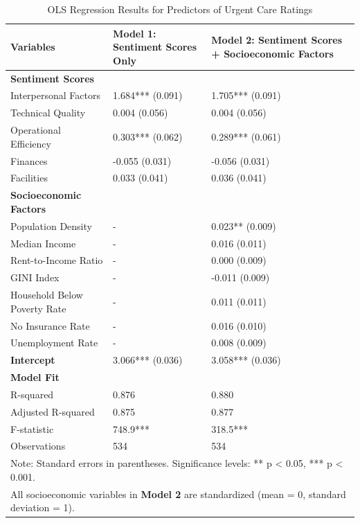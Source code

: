 \documentclass[journal,twoside,web]{ieeecolor}
\begin{document}
\begin{table}[htbp]
\centering
\caption{OLS Regression Results for Predictors of Urgent Care Ratings}
\label{tab:regression}
\begin{tabular}{p{5.5cm}p{5.5cm}p{5.5cm}}
\hline
\textbf{Variables} & \textbf{Model 1: Sentiment Scores Only} & \textbf{Model 2: Sentiment Scores + Socioeconomic Factors} \\
\hline
\textbf{Sentiment Scores} & & \\
Interpersonal Factors & 1.684*** (0.091) & 1.705*** (0.091) \\
Technical Quality & 0.004 (0.056) & 0.004 (0.056) \\
Operational Efficiency & 0.303*** (0.062) & 0.289*** (0.061) \\
Finances & -0.055 (0.031) & -0.056 (0.031) \\
Facilities & 0.033 (0.041) & 0.036 (0.041) \\
\textbf{Socioeconomic Factors} & & \\
Population Density & - & 0.023** (0.009) \\
Median Income & - & 0.016 (0.011) \\
Rent-to-Income Ratio & - & 0.000 (0.009) \\
GINI Index & - & -0.011 (0.009) \\
Household Below Poverty Rate & - & 0.011 (0.011) \\
No Insurance Rate & - & 0.016 (0.010) \\
Unemployment Rate & - & 0.008 (0.009) \\
\textbf{Intercept} & 3.066*** (0.036) & 3.058*** (0.036) \\
\hline
\textbf{Model Fit} & & \\
R-squared & 0.876 & 0.880 \\
Adjusted R-squared & 0.875 & 0.877 \\
F-statistic & 748.9*** & 318.5*** \\
Observations & 534 & 534 \\
\hline
\multicolumn{3}{p{16.5cm}}{\centering\small Note: Standard errors in parentheses. Significance levels: ** p < 0.05, *** p < 0.001.} \\
\multicolumn{3}{p{16.5cm}}{\centering\small All socioeconomic variables in \textbf{Model 2} are standardized (mean = 0, standard deviation = 1).} \\
\end{tabular}
\end{table}
\end{document}
